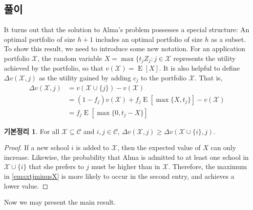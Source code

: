 \documentclass[12pt]{article} %
\newif\ifEN
\newtheorem{lemma}{Lemma}
\theoremstyle{definition}
\newtheorem{lemma}{기본정리}
\theoremstyle{definition}
\begin{document}
\ifEN \subsection{Solution}  \else \subsection{풀이} \fi
It turns out that the solution to Alma's problem possesses a special structure: An optimal portfolio of size $h+1$ includes an optimal portfolio of size $h$ as a subset. To show this result, we need to introduce some new notation. For an application portfolio $\mathcal{X}$, the random variable $X  = \max\{ t_j Z_j : j \in \mathcal{X}$ represents the utility achieved by the portfolio, so that $v(\mathcal{X}) = \operatorname{E}[X]$. It is also helpful to define $\Delta v(\mathcal{X}, j)$ as the utility gained by adding $c_j$ to the portfolio $\mathcal{X}$. That is, 
\begin{align} \Delta v(\mathcal{X}, j) &= v(\mathcal{X} \cup \{j\})  - v(\mathcal{X}) \\
&= (1 - f_j) v(\mathcal{X}) + f_j \operatorname{E}[\max\{X, t_j\}] - v(\mathcal{X}) \\
&= f_j \operatorname{E}[\max\{0, t_j - X\}]  \label{emaxtjminusX}
\end{align}

\begin{lemma}
For all $\mathcal{X}\subseteq \mathcal{C}$ and $i, j \in \mathcal{C}$, $\Delta v(\mathcal{X}, j) \geq \Delta v(\mathcal{X} \cup \{i\}, j)$. 
\end{lemma}
\begin{proof}
If a new school $i$ is added to $\mathcal{X}$, then the expected value of $X$ can only increase. Likewise, the probability that Alma is admitted to at least one school in $\mathcal{X}\cup\{i\}$ that she prefers to $j$ must be higher than in $\mathcal{X}$. Therefore, the maximum in \eqref{emaxtjminusX} is more likely to occur in the second entry, and achieves a lower value. 
\end{proof}
Now we may present the main result.
\end{document}
